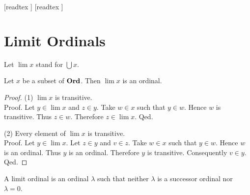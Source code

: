 \documentclass[10pt]{article}
\begin{document}
  \begin{imports}
    \begin{forthel}
      [readtex ]
      [readtex ]
    \end{forthel}
  \end{imports}


  \section*{Limit Ordinals}

  \begin{forthel}
    Let $\lim x$ stand for $\bigcup x$.
  \end{forthel}

  \begin{forthel}
    \begin{proposition}[id=SET_THEORY_02_7202164443185152,printid]
      Let $x$ be a subset of $\textbf{Ord}$.
      Then $\lim x$ is an ordinal.
    \end{proposition}
    \begin{proof}
      (1) $\lim x$ is transitive. \\
      Proof.
        Let $y \in \lim x$ and $z \in y$.
        Take $w \in x$ such that $y \in w$.
        Hence $w$ is transitive.
        Thus $z \in w$.
        Therefore $z \in \lim x$.
      Qed.

      (2) Every element of $\lim x$ is transitive. \\
      Proof.
        Let $y \in \lim x$.
        Let $z \in y$ and $v \in z$.
        Take $w \in x$ such that $y \in w$.
        Hence $w$ is an ordinal.
        Thus $y$ is an ordinal.
        Therefore $y$ is transitive.
        Consequently $v \in y$.
      Qed.
    \end{proof}
  \end{forthel}

  \begin{forthel}
    \begin{definition}[id=SET_THEORY_02_7678388934279168,printid]
      A limit ordinal is an ordinal $\lambda$ such that neither $\lambda$ is a successor ordinal nor $\lambda = 0$.
    \end{definition}
  \end{forthel}
\end{document}
